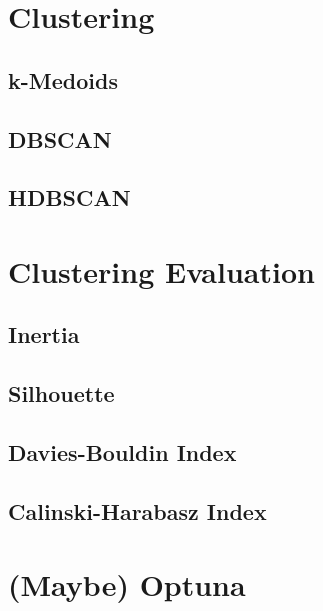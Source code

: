 \documentclass[10pt,oneside]{report}
\begin{document}
\section{Clustering}
\subsection{k-Medoids}
\subsection{DBSCAN}
\subsection{HDBSCAN}

\section{Clustering Evaluation}
\subsection{Inertia}
\subsection{Silhouette}
\subsection{Davies-Bouldin Index}
\subsection{Calinski-Harabasz Index}

\section{(Maybe) Optuna}
\end{document}
